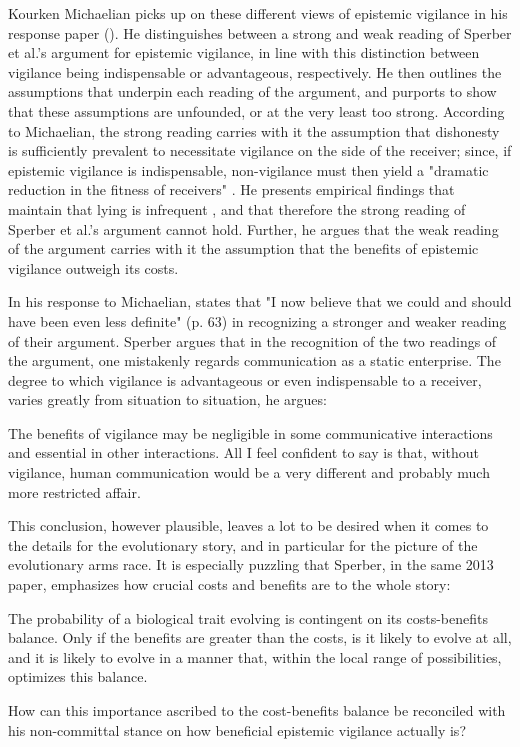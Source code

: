 Kourken Michaelian picks up on these different views of epistemic vigilance in his response paper (\citeyear{Michaelian13}). He distinguishes between a strong and weak reading of Sperber et al.'s argument for epistemic vigilance, in line with this distinction between vigilance being indispensable or advantageous, respectively.
He then outlines the assumptions that underpin each reading of the argument, and purports to show that these assumptions are unfounded, or at the very least too strong.
According to Michaelian, the strong reading carries with it the assumption that dishonesty is sufficiently prevalent to necessitate vigilance on the side of the receiver; since, if epistemic vigilance is indispensable, non-vigilance must then yield a "dramatic reduction in the fitness of receivers" \citep[p.~39]{Michaelian13}. He presents empirical findings that maintain that lying is infrequent \citep{Serota10}, and that therefore the strong reading of Sperber et al.'s argument cannot hold.
Further, he argues that the weak reading of the argument carries with it the assumption that the benefits of epistemic vigilance outweigh its costs.

In his response to Michaelian, \citet{Sperber13} states that "I now believe that we could and should have been even less definite" (p. 63) in recognizing a stronger and weaker reading of their argument. Sperber argues that in the recognition of the two readings of the argument, one mistakenly regards communication as a static enterprise. The degree to which vigilance is advantageous or even indispensable to a receiver, varies greatly from situation to situation, he argues:
\begin{quoting}
    The benefits of vigilance may be negligible in some communicative interactions and essential in other interactions. All I feel confident to say is that, without vigilance, human communication would be a very different and probably much more restricted affair.
    \hfill \citep[p.~63]{Sperber13}
\end{quoting}
This conclusion, however plausible, leaves a lot to be desired when it comes to the details for the evolutionary story, and in particular for the picture of the evolutionary arms race.
It is especially puzzling that Sperber, in the same 2013 paper, emphasizes how crucial costs and benefits are to the whole story:
\begin{quoting}
    The probability of a biological trait evolving is contingent on its costs-benefits balance. Only if the benefits are greater than the costs, is it likely to evolve at all, and it is likely to evolve in a manner that, within the local range of possibilities, optimizes this balance.
    \hfill \citep[p.~62]{Sperber13}
\end{quoting}
How can this importance ascribed to the cost-benefits balance be reconciled with his non-committal stance on how beneficial epistemic vigilance actually is?

